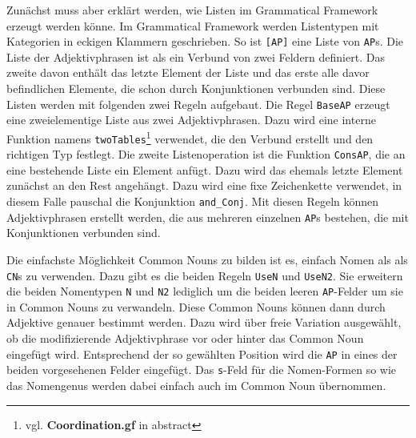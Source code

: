 Zunächst muss aber erklärt werden, wie Listen im Grammatical Framework erzeugt werden könne. Im Grammatical Framework werden Listentypen mit Kategorien in eckigen Klammern geschrieben. So ist \texttt{[AP]} eine Liste von \texttt{AP}s. Die Liste der Adjektivphrasen ist als ein Verbund von zwei Feldern definiert. Das zweite davon enthält das letzte Element der Liste und das erste alle davor befindlichen Elemente, die schon durch Konjunktionen verbunden sind. Diese Listen werden mit folgenden zwei Regeln aufgebaut. Die Regel \texttt{BaseAP} erzeugt eine zweielementige Liste aus zwei Adjektivphrasen. Dazu wird eine interne Funktion namens \texttt{twoTables}\footnote{vgl. \textbf{Coordination.gf} in abstract} verwendet, die den Verbund erstellt und den richtigen Typ festlegt. Die zweite Listenoperation ist die Funktion \texttt{ConsAP}, die an eine bestehende Liste ein Element anfügt. Dazu wird das ehemals letzte Element zunächst an den Rest angehängt. Dazu wird eine fixe Zeichenkette verwendet, in diesem Falle pauschal die Konjunktion \texttt{and\_Conj}. Mit diesen Regeln können Adjektivphrasen erstellt werden, die aus mehreren einzelnen \texttt{AP}s bestehen, die mit Konjunktionen verbunden sind.\par
Die einfachste Möglichkeit Common Nouns zu bilden ist es, einfach Nomen als als \texttt{CN}s zu verwenden. Dazu gibt es die beiden Regeln \texttt{UseN} und \texttt{UseN2}. Sie erweitern die beiden Nomentypen \texttt{N} und \texttt{N2} lediglich um die beiden leeren \texttt{AP}-Felder um sie in Common Nouns zu verwandeln. Diese Common Nouns können dann durch Adjektive genauer bestimmt werden. Dazu wird über freie Variation ausgewählt, ob die modifizierende Adjektivphrase vor oder hinter das Common Noun eingefügt wird. Entsprechend der so gewählten Position wird die \texttt{AP} in eines der beiden vorgesehenen Felder eingefügt. Das \texttt{s}-Feld für die Nomen-Formen so wie das Nomengenus werden dabei einfach auch im Common Noun übernommen. \par

